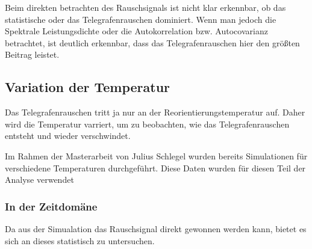 \documentclass[main.tex]{subfiles}
\begin{document}
Beim direkten betrachten des Rauschsignals ist nicht klar erkennbar, ob das statistische oder das Telegrafenrauschen dominiert. Wenn man jedoch die Spektrale Leistungsdichte oder die Autokorrelation bzw. Autocovarianz betrachtet, ist deutlich erkennbar, dass das Telegrafenrauschen hier den größten Beitrag leistet.


\subsection{Variation der Temperatur}

Das Telegrafenrauschen tritt ja nur an der Reorientierungstemperatur auf. Daher wird die Temperatur varriert, um zu beobachten, wie das Telegrafenrauschen entsteht und wieder verschwindet.

Im Rahmen der Masterarbeit von Julius Schlegel \cite{schlegel-master} wurden bereits Simulationen für verschiedene Temperaturen durchgeführt. Diese Daten wurden für diesen Teil der Analyse verwendet

\subsubsection{In der Zeitdomäne}

Da aus der Simualation das Rauschsignal direkt gewonnen werden kann, bietet es sich an dieses statistisch zu untersuchen.
\end{document}
